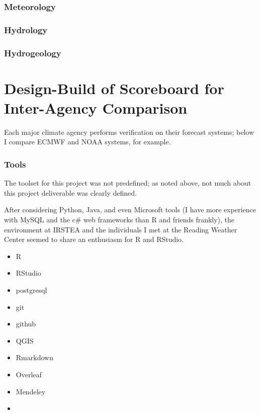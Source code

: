 \documentclass[logos,parttoc,morelanguage=french,morelanguage=italian]{orsay-memoire}
\begin{document}
\section{Meteorology}

\section{Hydrology}

\section{Hydrogeology}



\part{Design-Build of Scoreboard for Inter-Agency Comparison}

Each major climate agency performs verification on their forecast systems; below I compare ECMWF and NOAA systems, for example. 
\cite{JolliffeIanT.andStephenson2012ForecastVerification}

\section{Tools}

The toolset for this project was not predefined; as noted above, not much about this project deliverable was clearly defined.

After considering Python, Java, and even Microsoft tools (I have more experience with MySQL and the c\# web frameworks than R and friends frankly), the environment at IRSTEA and the individuals I met at the Reading Weather Center seemed to share an enthusiasm for R and RStudio.

\begin{itemize}
\item R
\item RStudio
\item postgresql
\item git
\item github
\item QGIS
\item Rmarkdown
\item Overleaf
\item Mendeley
\item 


\end{itemize}
\end{document}

